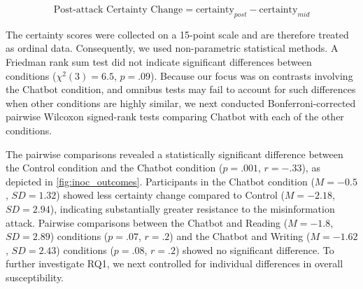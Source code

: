 \documentclass[sigconf]{acmart}
\begin{document}
\begin{equation}
\label{eq:postattackcertaintychange}
\text{Post-attack Certainty Change} = \text{certainty}_{post} - \text{certainty}_{mid}
\end{equation}

The certainty scores were collected on a 15-point scale and are therefore treated as ordinal data.
Consequently, we used non-parametric statistical methods.
A Friedman rank sum test did not indicate significant differences between conditions ($\chi^2(3) =6.5$, $p = .09$). 
Because our focus was on contrasts involving the Chatbot condition, and omnibus tests may fail to account for such differences when other conditions are highly similar, we next conducted Bonferroni-corrected pairwise Wilcoxon signed-rank tests comparing Chatbot with each of the other conditions.



The pairwise comparisons revealed a statistically significant difference between the Control condition and the Chatbot condition ($p = .001$, $r = -.33$), as depicted in \autoref{fig:inoc_outcomes}.
Participants in the Chatbot condition ($M = -0.5$, $SD = 1.32$) showed less certainty change compared to Control ($M= -2.18$, $SD = 2.94$), indicating substantially greater resistance to the misinformation attack.
Pairwise comparisons between the Chatbot and Reading ($M = -1.8$, $SD = 2.89$) conditions ($p = .07$, $r = .2$) and the Chatbot and Writing ($M = -1.62$, $SD = 2.43$) conditions ($p = .08$, $r = .2$) showed no significant difference. 
To further investigate RQ1, we next controlled for individual differences in overall susceptibility. 
\end{document}
